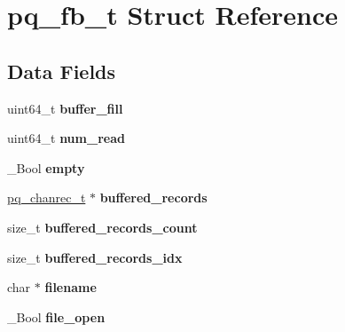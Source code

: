 \hypertarget{structpq__fb__t}{}\section{pq\+\_\+fb\+\_\+t Struct Reference}
\label{structpq__fb__t}
\subsection*{Data Fields}
\begin{DoxyCompactItemize}
\item 
\hypertarget{structpq__fb__t_a7c7c8e0765c162f77155fa19fb53a3c5}{}uint64\+\_\+t {\bfseries buffer\+\_\+fill}\label{structpq__fb__t_a7c7c8e0765c162f77155fa19fb53a3c5}

\item 
\hypertarget{structpq__fb__t_a4893132bc6af39eff28a6ec76dcd3312}{}uint64\+\_\+t {\bfseries num\+\_\+read}\label{structpq__fb__t_a4893132bc6af39eff28a6ec76dcd3312}

\item 
\hypertarget{structpq__fb__t_aa6b8566db3cfbcb5f0da789fe084a2f0}{}\+\_\+\+Bool {\bfseries empty}\label{structpq__fb__t_aa6b8566db3cfbcb5f0da789fe084a2f0}

\item 
\hypertarget{structpq__fb__t_a63fb8db00db71bb17695283f132d6d0e}{}\hyperlink{structpq__chanrec__t}{pq\+\_\+chanrec\+\_\+t} $\ast$ {\bfseries buffered\+\_\+records}\label{structpq__fb__t_a63fb8db00db71bb17695283f132d6d0e}

\item 
\hypertarget{structpq__fb__t_a3c631d15f3359c5a881539c5e01bb9b2}{}size\+\_\+t {\bfseries buffered\+\_\+records\+\_\+count}\label{structpq__fb__t_a3c631d15f3359c5a881539c5e01bb9b2}

\item 
\hypertarget{structpq__fb__t_aa0a1a7dbae433b1361bcc6c6ecbc19e0}{}size\+\_\+t {\bfseries buffered\+\_\+records\+\_\+idx}\label{structpq__fb__t_aa0a1a7dbae433b1361bcc6c6ecbc19e0}

\item 
\hypertarget{structpq__fb__t_ad270be9b4551c618826edab65d9c6d7a}{}char $\ast$ {\bfseries filename}\label{structpq__fb__t_ad270be9b4551c618826edab65d9c6d7a}

\item 
\hypertarget{structpq__fb__t_aaa3ff79eae33c626401f520a51811618}{}\+\_\+\+Bool {\bfseries file\+\_\+open}\label{structpq__fb__t_aaa3ff79eae33c626401f520a51811618}


\end{DoxyCompactItemize}
